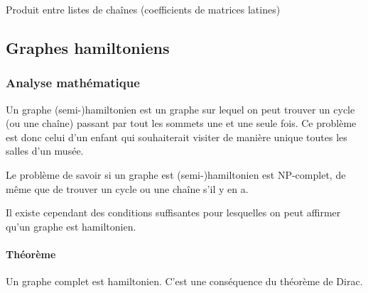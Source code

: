     \begin{algorithm}
      \caption{Produit entre listes de chaînes (coefficients de matrices
      latines)}
      \label{alg:prod_chaine}
    \end{algorithm}

\subsection{Graphes hamiltoniens}
  \subsubsection{Analyse mathématique}
    Un graphe (semi-)hamiltonien est un graphe sur lequel on peut
    trouver un cycle (ou une chaîne) passant par tout les sommets une et une
    seule fois. Ce problème est donc celui d'un enfant qui souhaiterait visiter
    de manière unique toutes les salles d'un musée.

    Le problème de savoir si un graphe est (semi-)hamiltonien est NP-complet,
    de même que de trouver un cycle ou une chaîne s'il y en a.

    Il existe cependant des conditions suffisantes pour lesquelles on peut
    affirmer qu'un graphe est hamiltonien.

    \paragraph{Théorème} Un graphe complet est hamiltonien. C'est une
    conséquence du théorème de Dirac.

